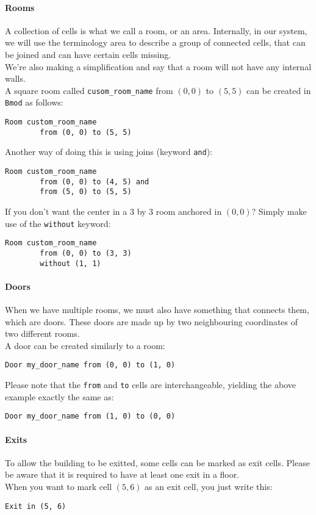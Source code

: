 \documentclass[review]{elsarticle}
\begin{document}
\paragraph{Rooms} A collection of cells is what we call a room, or an area. Internally, in our system, we will use the terminology \textsf{area} to describe a group of connected cells, that can be joined and can have certain cells missing.\\
We're also making a simplification and say that a room will not have any internal walls.\\
A square room called \texttt{cusom\_room\_name} from $(0, 0)$ to $(5, 5)$ can be created in \texttt{Bmod} as follows:
\begin{lstlisting}[language=Bmod]
	Room custom_room_name
		from (0, 0) to (5, 5)
\end{lstlisting}
Another way of doing this is using joins (keyword \texttt{and}):
\begin{lstlisting}[language=Bmod]
	Room custom_room_name
		from (0, 0) to (4, 5) and
		from (5, 0) to (5, 5)
\end{lstlisting}
If you don't want the center in a 3 by 3 room anchored in $(0, 0)$? Simply make use of the \texttt{without} keyword:
\begin{lstlisting}[language=Bmod]
	Room custom_room_name
		from (0, 0) to (3, 3)
		without (1, 1)
\end{lstlisting}

\paragraph{Doors} When we have multiple rooms, we must also have something that connects them, which are doors. These doors are made up by two neighbouring coordinates of two different rooms.\\
A door can be created similarly to a room:
\begin{lstlisting}[language=Bmod]
	Door my_door_name from (0, 0) to (1, 0)
\end{lstlisting}
Please note that the \texttt{from} and \texttt{to} cells are interchangeable, yielding the above example exactly the same as:
\begin{lstlisting}[language=Bmod]
	Door my_door_name from (1, 0) to (0, 0)
\end{lstlisting}

\paragraph{Exits} To allow the building to be exitted, some cells can be marked as exit cells. Please be aware that it is required to have at least one exit in a floor.\\
When you want to mark cell $(5, 6)$ as an exit cell, you just write this:
\begin{lstlisting}[language=Bmod]
	Exit in (5, 6)
\end{lstlisting}
\end{document}
